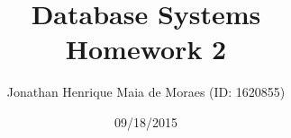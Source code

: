 \title{Database Systems \\ Homework 2}
\author{Jonathan Henrique Maia de Moraes (ID: 1620855)}
\date{09/18/2015}
\maketitle